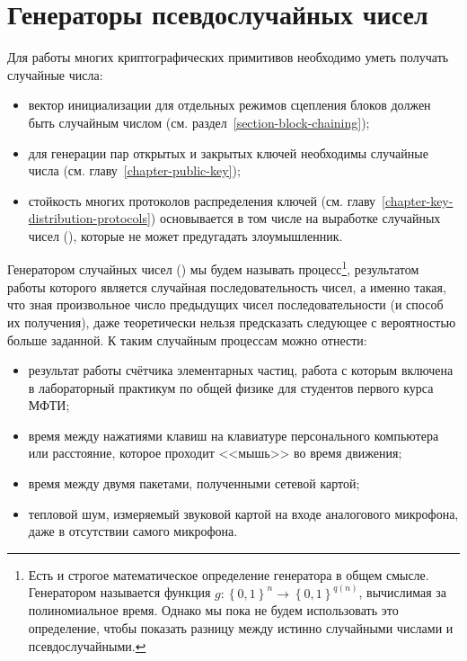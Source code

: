 \chapter{Генераторы псевдослучайных чисел}\label{chapter-generators}

Для работы многих криптографических примитивов необходимо уметь получать случайные числа:
\begin{itemize}
	\item вектор инициализации для отдельных режимов сцепления блоков должен быть случайным числом (см. раздел~\ref{section-block-chaining});
	\item для генерации пар открытых и закрытых ключей необходимы случайные числа (см. главу~\ref{chapter-public-key});
	\item стойкость многих протоколов распределения ключей (см. главу~\ref{chapter-key-distribution-protocols}) основывается в том числе на выработке случайных чисел (), которые не может предугадать злоумышленник.
\end{itemize}

Генератором случайных чисел () мы будем называть процесс\footnote{Есть и строгое математическое определение генератора в общем смысле. Генератором называется функция $g: \left\{0, 1\right\}^{n} \to \left\{0, 1\right\}^{q\left(n\right)}$, вычислимая за полиномиальное время. Однако мы пока не будем использовать это определение, чтобы показать разницу между истинно случайными числами и псевдослучайными.}, результатом работы которого является случайная последовательность чисел, а именно такая, что зная произвольное число предыдущих чисел последовательности (и способ их получения), даже теоретически нельзя предсказать следующее с вероятностью больше заданной. К таким случайным процессам можно отнести:

\begin{itemize}
	\item результат работы счётчика элементарных частиц, работа с которым включена в лабораторный практикум по общей физике для студентов первого курса МФТИ;
	\item время между нажатиями клавиш на клавиатуре персонального компьютера или расстояние, которое проходит <<мышь>> во время движения;
	\item время между двумя пакетами, полученными сетевой картой;
	\item тепловой шум, измеряемый звуковой картой на входе аналогового микрофона, даже в отсутствии самого микрофона.
\end{itemize}

